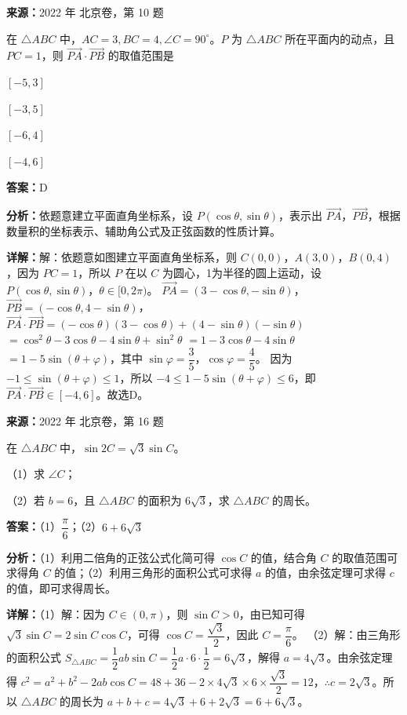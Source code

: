 \begin{question}[points=4]
\textbf{来源：}2022 年 北京卷，第 10 题\par
在 $\triangle ABC$ 中，$AC = 3, BC = 4, \angle C = 90^\circ$。$P$ 为 $\triangle ABC$ 所在平面内的动点，且 $PC = 1$，则 $\overrightarrow{PA} \cdot \overrightarrow{PB}$ 的取值范围是
\begin{choices}
  \item $[-5,3]$
  \item $[-3,5]$
  \item $[-6,4]$
  \item $[-4,6]$
\end{choices}
\begin{solution}
\textbf{答案：}D

\textbf{分析：}依题意建立平面直角坐标系，设 $P(\cos\theta,\sin\theta)$，表示出 $\overrightarrow{PA}$，$\overrightarrow{PB}$，根据数量积的坐标表示、辅助角公式及正弦函数的性质计算。

\textbf{详解：}解：依题意如图建立平面直角坐标系，则 $C(0,0)$，$A(3,0)$，$B(0,4)$，因为 $PC=1$，所以 $P$ 在以 $C$ 为圆心，1为半径的圆上运动，设 $P(\cos\theta,\sin\theta)$，$\theta \in [0,2\pi)$。
$\overrightarrow{PA} = (3-\cos\theta, -\sin\theta)$，$\overrightarrow{PB} = (-\cos\theta, 4-\sin\theta)$，
$\overrightarrow{PA} \cdot \overrightarrow{PB} = (-\cos\theta)(3-\cos\theta) + (4-\sin\theta)(-\sin\theta)$
$= \cos^2\theta - 3\cos\theta - 4\sin\theta + \sin^2\theta$
$= 1 - 3\cos\theta - 4\sin\theta$
$= 1 - 5\sin(\theta + \varphi)$，其中 $\sin\varphi = \dfrac{3}{5}$，$\cos\varphi = \dfrac{4}{5}$。
因为 $-1 \leq \sin(\theta + \varphi) \leq 1$，所以 $-4 \leq 1 - 5\sin(\theta + \varphi) \leq 6$，即 $\overrightarrow{PA} \cdot \overrightarrow{PB} \in [-4,6]$。故选D。
\end{solution}
\end{question}

\begin{question}[points=13]
\textbf{来源：}2022 年 北京卷，第 16 题\par
在 $\triangle ABC$ 中，$\sin 2C = \sqrt{3} \sin C$。

（1）求 $\angle C$；

（2）若 $b=6$，且 $\triangle ABC$ 的面积为 $6\sqrt{3}$，求 $\triangle ABC$ 的周长。
\begin{solution}
\textbf{答案：}（1）$\dfrac{\pi}{6}$；（2）$6+6\sqrt{3}$

\textbf{分析：}（1）利用二倍角的正弦公式化简可得 $\cos C$ 的值，结合角 $C$ 的取值范围可求得角 $C$ 的值；（2）利用三角形的面积公式可求得 $a$ 的值，由余弦定理可求得 $c$ 的值，即可求得周长。

\textbf{详解：}（1）解：因为 $C\in(0,\pi)$，则 $\sin C>0$，由已知可得 $\sqrt{3}\sin C = 2\sin C\cos C$，可得 $\cos C = \dfrac{\sqrt{3}}{2}$，因此 $C=\dfrac{\pi}{6}$。
（2）解：由三角形的面积公式 $S_{\triangle ABC} = \dfrac{1}{2}ab\sin C = \dfrac{1}{2}a\cdot 6\cdot \dfrac{1}{2} = 6\sqrt{3}$，解得 $a=4\sqrt{3}$。由余弦定理得 $c^2 = a^2+b^2-2ab\cos C = 48+36-2\times 4\sqrt{3}\times 6\times \dfrac{\sqrt{3}}{2} = 12$，$\therefore c=2\sqrt{3}$。所以 $\triangle ABC$ 的周长为 $a+b+c = 4\sqrt{3}+6+2\sqrt{3} = 6+6\sqrt{3}$。
\end{solution}
\end{question}

